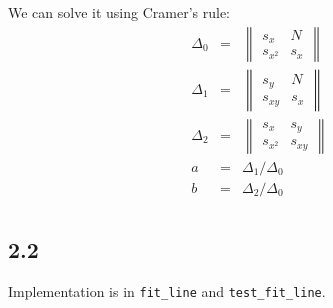 \documentclass[a4paper]{article}
\begin{document}
We can solve it using Cramer's rule:
\begin{eqnarray*}
\Delta_0 &=& \begin{Vmatrix} s_x & N \\ s_{x^2} & s_x \end{Vmatrix} \\
\Delta_1 &=& \begin{Vmatrix} s_y & N \\ s_{xy} & s_x \end{Vmatrix} \\
\Delta_2 &=& \begin{Vmatrix} s_x & s_y \\ s_{x^2} & s_{xy} \end{Vmatrix} \\
a &=& \Delta_1 / \Delta_0 \\
b &=& \Delta_2 / \Delta_0 \\
\end{eqnarray*}

\subsection*{2.2}

Implementation is in \texttt{fit\_line} and \texttt{test\_fit\_line}.
\end{document}
